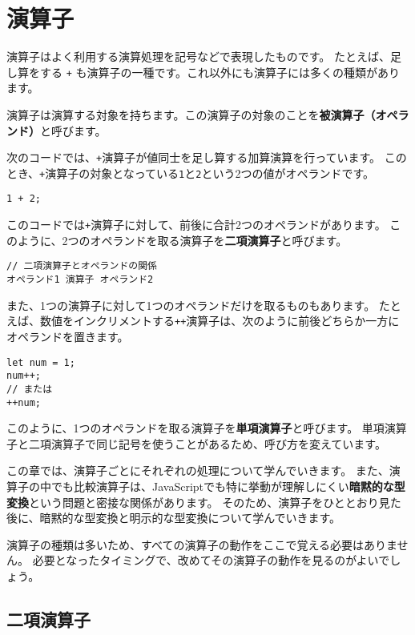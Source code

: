 \hypertarget{operator}{%
\chapter{演算子}\label{operator}}

演算子はよく利用する演算処理を記号などで表現したものです。
たとえば、足し算をする \texttt{+}
も演算子の一種です。これ以外にも演算子には多くの種類があります。

演算子は演算する対象を持ちます。この演算子の対象のことを\textbf{被演算子（オペランド）}と呼びます。

次のコードでは、\texttt{+}演算子が値同士を足し算する加算演算を行っています。
このとき、\texttt{+}演算子の対象となっている\texttt{1}と\texttt{2}という2つの値がオペランドです。

\begin{lstlisting}
1 + 2;
\end{lstlisting}

このコードでは\texttt{+}演算子に対して、前後に合計2つのオペランドがあります。
このように、2つのオペランドを取る演算子を\textbf{二項演算子}と呼びます。

\begin{lstlisting}
// 二項演算子とオペランドの関係
オペランド1 演算子 オペランド2
\end{lstlisting}

また、1つの演算子に対して1つのオペランドだけを取るものもあります。
たとえば、数値をインクリメントする\texttt{++}演算子は、次のように前後どちらか一方にオペランドを置きます。

\begin{lstlisting}
let num = 1;
num++;
// または
++num;
\end{lstlisting}

このように、1つのオペランドを取る演算子を\textbf{単項演算子}と呼びます。
単項演算子と二項演算子で同じ記号を使うことがあるため、呼び方を変えています。

この章では、演算子ごとにそれぞれの処理について学んでいきます。
また、演算子の中でも比較演算子は、JavaScriptでも特に挙動が理解しにくい\textbf{暗黙的な型変換}という問題と密接な関係があります。
そのため、演算子をひととおり見た後に、暗黙的な型変換と明示的な型変換について学んでいきます。

演算子の種類は多いため、すべての演算子の動作をここで覚える必要はありません。
必要となったタイミングで、改めてその演算子の動作を見るのがよいでしょう。

\hypertarget{binary-operator}{%
\section{二項演算子}\label{binary-operator}}


